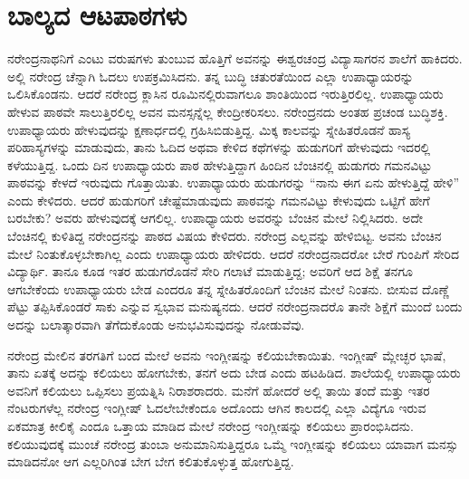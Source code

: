 
\chapter{ಬಾಲ್ಯದ ಆಟಪಾಠಗಳು}

ನರೇಂದ್ರನಾಥನಿಗೆ ಎಂಟು ವರುಷಗಳು ತುಂಬುವ ಹೊತ್ತಿಗೆ ಅವನನ್ನು ಈಶ್ವರಚಂದ್ರ ವಿದ್ಯಾಸಾಗರನ ಶಾಲೆಗೆ ಹಾಕಿದರು. ಅಲ್ಲಿ ನರೇಂದ್ರ ಚೆನ್ನಾಗಿ ಓದಲು ಉಪಕ್ರಮಿಸಿದನು. ತನ್ನ ಬುದ್ಧಿ ಚತುರತೆಯಿಂದ ಎಲ್ಲಾ ಉಪಾಧ್ಯಾಯರನ್ನು ಒಲಿಸಿಕೊಂಡನು. ಆದರೆ ನರೇಂದ್ರ ಕ್ಲಾಸಿನ ರೂಮಿನಲ್ಲಿರುವಾಗಲೂ ಶಾಂತಿಯಿಂದ ಇರುತ್ತಿರಲಿಲ್ಲ. ಉಪಾಧ್ಯಾಯರು ಹೇಳುವ ಪಾಠವೇ ಸಾಲುತ್ತಿರಲಿಲ್ಲ ಅವನ ಮನಸ್ಸನ್ನೆಲ್ಲ ಕೇಂದ್ರೀಕರಿಸಲು. ನರೇಂದ್ರನದು ಅಂತಹ ಪ್ರಚಂಡ ಬುದ್ಧಿಶಕ್ತಿ. ಉಪಾಧ್ಯಾಯರು ಹೇಳುವುದನ್ನು ಕ್ಷಣಾರ್ಧದಲ್ಲಿ ಗ್ರಹಿಸಿಬಿಡುತ್ತಿದ್ದ. ಮಿಕ್ಕ ಕಾಲವನ್ನು ಸ್ನೇಹಿತರೊಡನೆ ಹಾಸ್ಯ ಪರಿಹಾಸ್ಯಗಳನ್ನು ಮಾಡುವುದು, ತಾನು ಓದಿದ ಅಥವಾ ಕೇಳಿದ ಕಥೆಗಳನ್ನು ಹುಡುಗರಿಗೆ ಹೇಳುವುದು ಇದರಲ್ಲಿ ಕಳೆಯುತ್ತಿದ್ದ. ಒಂದು ದಿನ ಉಪಾಧ್ಯಾಯರು ಪಾಠ ಹೇಳುತ್ತಿದ್ದಾಗ ಹಿಂದಿನ ಬೆಂಚಿನಲ್ಲಿ ಹುಡುಗರು ಗಮನವಿಟ್ಟು ಪಾಠವನ್ನು ಕೇಳದೆ ಇರುವುದು ಗೊತ್ತಾಯಿತು. ಉಪಾಧ್ಯಾಯರು ಹುಡುಗರನ್ನು “ನಾನು ಈಗ ಏನು ಹೇಳುತ್ತಿದ್ದೆ ಹೇಳಿ” ಎಂದು ಕೇಳಿದರು. ಆದರೆ ಹುಡುಗರಿಗೆ ಚೇಷ್ಟೆಮಾಡುವುದು ಪಾಠವನ್ನು ಗಮನವಿಟ್ಟು ಕೇಳುವುದು ಒಟ್ಟಿಗೆ ಹೇಗೆ ಬರಬೇಕು? ಅವರು ಹೇಳುವುದಕ್ಕೆ ಆಗಲಿಲ್ಲ. ಉಪಾಧ್ಯಾಯರು ಅವರನ್ನು ಬೆಂಚಿನ ಮೇಲೆ ನಿಲ್ಲಿಸಿದರು. ಅದೇ ಬೆಂಚಿನಲ್ಲಿ ಕುಳಿತಿದ್ದ ನರೇಂದ್ರನನ್ನು ಪಾಠದ ವಿಷಯ ಕೇಳಿದರು. ನರೇಂದ್ರ ಎಲ್ಲವನ್ನು ಹೇಳಿಬಿಟ್ಟ. ಅವನು ಬೆಂಚಿನ ಮೇಲೆ ನಿಂತುಕೊಳ್ಳಬೇಕಾಗಿಲ್ಲ ಎಂದು ಉಪಾಧ್ಯಾಯರು ಹೇಳಿದರು. ಆದರೆ ನರೇಂದ್ರನಾದರೋ ಬೇರೆ ಗುಂಪಿಗೆ ಸೇರಿದ ವಿದ್ಯಾರ್ಥಿ. ತಾನೂ ಕೂಡ ಇತರ ಹುಡುಗರೊಡನೆ ಸೇರಿ ಗಲಾಟೆ ಮಾಡುತ್ತಿದ್ದ; ಅವರಿಗೆ ಆದ ಶಿಕ್ಷೆ ತನಗೂ ಆಗಬೇಕೆಂದು ಉಪಾಧ್ಯಾಯರು ಬೇಡ ಎಂದರೂ ತನ್ನ ಸ್ನೇಹಿತರೊಂದಿಗೆ ಬೆಂಚಿನ ಮೇಲೆ ನಿಂತನು. ಬೀಸುವ ದೊಣ್ಣೆ ಪೆಟ್ಟು ತಪ್ಪಿಸಿಕೊಂಡರೆ ಸಾಕು ಎನ್ನುವ ಸ್ವಭಾವ ಮನುಷ್ಯನದು. ಆದರೆ ನರೇಂದ್ರನಾದರೊ ತಾನೇ ಶಿಕ್ಷೆಗೆ ಮುಂದೆ ಬಂದು ಅದನ್ನು ಬಲಾತ್ಕಾರವಾಗಿ ತೆಗೆದುಕೊಂಡು ಅನುಭವಿಸುವುದನ್ನು ನೋಡುವೆವು.

ನರೇಂದ್ರ ಮೇಲಿನ ತರಗತಿಗೆ ಬಂದ ಮೇಲೆ ಅವನು ಇಂಗ್ಲೀಷನ್ನು ಕಲಿಯಬೇಕಾಯಿತು. ಇಂಗ್ಲೀಷ್ ಮ್ಲೇಚ್ಛರ ಭಾಷೆ, ತಾನು ಏತಕ್ಕೆ ಅದನ್ನು ಕಲಿಯಲು ಹೋಗಬೇಕು, ತನಗೆ ಅದು ಬೇಡ ಎಂದು ಹಟಹಿಡಿದ. ಶಾಲೆಯಲ್ಲಿ ಉಪಾಧ್ಯಾಯರು ಅವನಿಗೆ ಕಲಿಯಲು ಒಪ್ಪಿಸಲು ಪ್ರಯತ್ನಿಸಿ ನಿರಾಶರಾದರು. ಮನೆಗೆ ಹೋದರೆ ಅಲ್ಲಿ ತಾಯಿ ತಂದೆ ಮತ್ತು ಇತರ ನೆಂಟರುಗಳೆಲ್ಲ ನರೇಂದ್ರ ಇಂಗ್ಲೀಷ್ ಓದಲೇಬೇಕೆಂದೂ ಅದೊಂದು ಆಗಿನ ಕಾಲದಲ್ಲಿ ಎಲ್ಲಾ ವಿದ್ಯೆಗೂ ಇರುವ ಏಕಮಾತ್ರ ಕೀಲಿಕೈ ಎಂದೂ ಒತ್ತಾಯ ಮಾಡಿದ ಮೇಲೆ ನರೇಂದ್ರ ಇಂಗ್ಲೀಷನ್ನು ಕಲಿಯಲು ಪ್ರಾರಂಭಿಸಿದನು. ಕಲಿಯುವುದಕ್ಕೆ ಮುಂಚೆ ನರೇಂದ್ರ ತುಂಬಾ ಅನುಮಾನಿಸುತ್ತಿದ್ದರೂ ಒಮ್ಮೆ ಇಂಗ್ಲೀಷನ್ನು ಕಲಿಯಲು ಯಾವಾಗ ಮನಸ್ಸು ಮಾಡಿದನೋ ಆಗ ಎಲ್ಲರಿಗಿಂತ ಬೇಗ ಬೇಗ ಕಲಿತುಕೊಳ್ಳುತ್ತ ಹೋಗುತ್ತಿದ್ದ.

